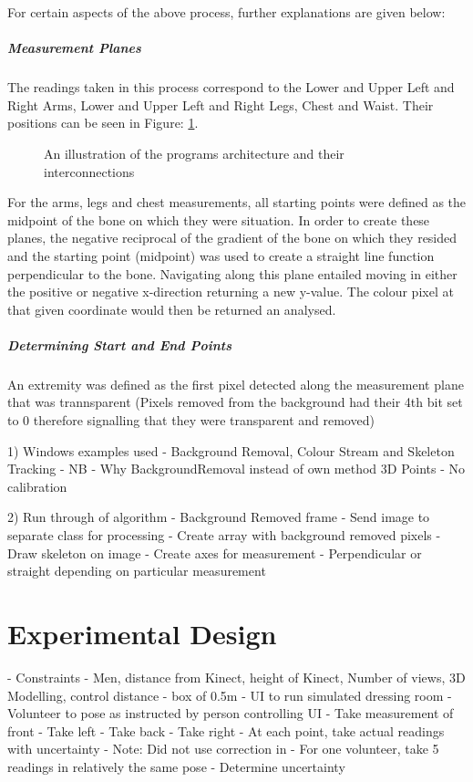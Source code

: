 For certain aspects of the above process, further explanations are given below:

\subparagraph{Measurement Planes}
The readings taken in this process correspond to the Lower and Upper Left and Right Arms, Lower and Upper Left and Right Legs, Chest and Waist. Their positions can be seen in Figure: \ref{fig:measurementPlanes}.

\begin{figure}[ht]
	\centering
	{%
		\setlength{\fboxsep}{0pt}%
		\setlength{\fboxrule}{0.5pt}%
		}
	\caption{An illustration of the programs architecture and their interconnections}
	\label{fig:measurementPlanes}
\end{figure}

For the arms, legs and chest measurements, all starting points were defined as the midpoint of the bone on which they were situation. In order to create these planes, the negative reciprocal of the gradient of the bone on which they resided and the starting point (midpoint) was used to create a straight line function perpendicular to the bone. Navigating along this plane entailed moving in either the positive or negative x-direction returning a new y-value. The colour pixel at that given coordinate would then be returned an analysed.

\subparagraph{Determining Start and End Points}
An extremity was defined as the first pixel detected along the measurement plane that was trannsparent (Pixels removed from the background had their 4th bit set to 0 therefore signalling that they were transparent and removed)



1) Windows examples used - Background Removal, Colour Stream and Skeleton Tracking - NB - Why BackgroundRemoval instead of own method
3D Points - No calibration

2) Run through of algorithm
- Background Removed frame
- Send image to separate class for processing
- Create array with background removed pixels
- Draw skeleton on image
- Create axes for measurement - Perpendicular or straight depending on particular measurement

\section{Experimental Design}
- Constraints - Men, distance from Kinect, height of Kinect, Number of views, 3D Modelling, control distance - box of 0.5m
- UI to run simulated dressing room
- Volunteer to pose as instructed by person controlling UI
- Take measurement of front
- Take left
- Take back
- Take right 
- At each point, take actual readings with uncertainty
- Note: Did not use correction in \cite{nonContact2017}
- For one volunteer, take 5 readings in relatively the same pose - Determine uncertainty 